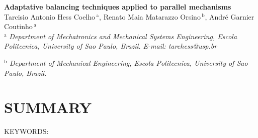 \documentclass[a4paper,11pt,brazil,fleqn]{article}
\begin{document}

\noindent
{\bf \huge Adaptative balancing techniques applied to parallel mechanisms}\\

\noindent
{\Large 	Tarcisio Antonio Hess Coelho$\,{}^\text{a}$, 
			Renato Maia Matarazzo Orsino$\,{}^\text{b}$, 
			Andr\'e Garnier Coutinho$\,{}^\text{a}$
}\\

\noindent
{${}^\text{a}$ \it Department of Mechatronics and Mechanical Systems Engineering, Escola Politecnica, 
University of Sao Paulo, Brazil. E-mail: tarchess@usp.br}

\noindent
{${}^\text{b}$ \it Department of Mechanical Engineering, Escola Politecnica, University of Sao Paulo, Brazil.}

\vspace{24pt}


\section*{SUMMARY}

\noindent
KEYWORDS: {}


































%






{} 






%
\end{document}
